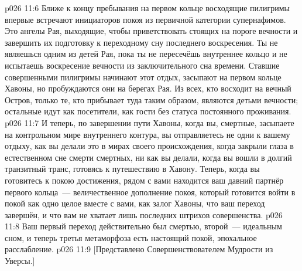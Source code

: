 \vs p026 11:6 \pc Ближе к концу пребывания на первом кольце восходящие пилигримы впервые встречают инициаторов покоя из первичной категории супернафимов. Это ангелы Рая, выходящие, чтобы приветствовать стоящих на пороге вечности и завершить их подготовку к переходному сну последнего воскресения. Ты не являешься одним из детей Рая, пока ты не пересечёшь внутреннее кольцо и не испытаешь воскресение вечности из заключительного сна времени. Ставшие совершенными пилигримы начинают этот отдых, засыпают на первом кольце Хавоны, но пробуждаются они на берегах Рая. Из всех, кто восходит на вечный Остров, только те, кто прибывает туда таким образом, являются детьми вечности; остальные идут как посетители, как гости без статуса постоянного проживания.
\vs p026 11:7 И теперь, по завершении пути Хавоны, когда вы, смертные, засыпаете на контрольном мире внутреннего контура, вы отправляетесь не одни к вашему отдыху, как вы делали это в мирах своего происхождения, когда закрыли глаза в естественном сне смерти смертных, ни как вы делали, когда вы вошли в долгий транзитный транс, готовясь к путешествию в Хавону. Теперь, когда вы готовитесь к покою достижения, рядом с вами находится ваш давний партнёр первого кольца~--- величественное дополнение покоя, который готовится войти в покой как одно целое вместе с вами, как залог Хавоны, что ваш переход завершён, и что вам не хватает лишь последних штрихов совершенства.
\vs p026 11:8 Ваш первый переход действительно был смертью, второй~--- идеальным сном, и теперь третья метаморфоза есть настоящий покой, эпохальное расслабление.
\vsetoff
\vs p026 11:9 [Представлено Совершенствователем Мудрости из Уверсы.]
\quizlink
